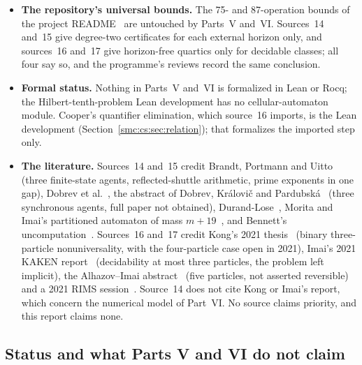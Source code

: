 \documentclass[11pt,letterpaper]{article}
\numberwithin{equation}{section}
\theoremstyle{definition}
\theoremstyle{remark}
\begin{document}
\begin{itemize}
\item \textbf{The repository's universal bounds.} The 75- and 87-operation bounds of the project README~\cite{repo} are untouched by Parts~V and~VI. Sources~14 and~15 give degree-two certificates for each external horizon only, and sources~16 and~17 give horizon-free quartics only for decidable classes; all four say so, and the programme's reviews record the same conclusion.
\item \textbf{Formal status.} Nothing in Parts~V and~VI is formalized in Lean or Rocq; the Hilbert-tenth-problem Lean development has no cellular-automaton module. Cooper's quantifier elimination, which source~16 imports, is the Lean development  (Section~\ref{smc:cs:sec:relation}); that formalizes the imported step only.
\item \textbf{The literature.} Sources~14 and~15 credit Brandt, Portmann and Uitto~\cite{brandt2020} (three finite-state agents, reflected-shuttle arithmetic, prime exponents in one gap), Dobrev et al.~\cite{dobrev2019}, the abstract of Dobrev, Kr\'alovi\v{c} and Pardubsk\'a~\cite{busy2026} (three synchronous agents, full paper not obtained), Durand-Lose~\cite{DL06}, Morita and Imai's partitioned automaton of mass $m+19$~\cite{moritaimai}, and Bennett's uncomputation~\cite{bennett}. Sources~16 and~17 credit Kong's 2021 thesis~\cite{kongthesis} (binary three-particle nonuniversality, with the four-particle case open in 2021), Imai's 2021 KAKEN report~\cite{kakenfinal} (decidability at most three particles, the problem left implicit), the Alhazov--Imai abstract~\cite{alhazovimai} (five particles, not asserted reversible) and a 2021 RIMS session~\cite{kongprogram,kaken}. Source~14 does not cite Kong or Imai's report, which concern the numerical model of Part~VI. No source claims priority, and this report claims none.
\end{itemize}

\subsection{Status and what Parts V and VI do not claim}\label{smc:tm:sec:status}
\end{document}
